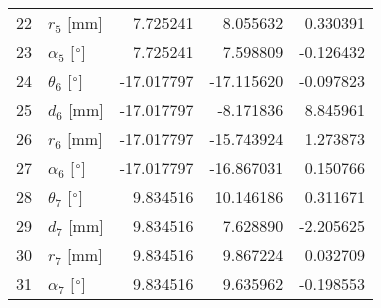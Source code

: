 \documentclass{standalone}%
\begin{document}
\begin{tabular}{llrrr}
22 &              $r_{5}$ [mm] &   7.725241 &   8.055632 &   0.330391 \\
23 &  $\alpha_{5}$ [$\degree$] &   7.725241 &   7.598809 &  -0.126432 \\
24 &  $\theta_{6}$ [$\degree$] & -17.017797 & -17.115620 &  -0.097823 \\
25 &              $d_{6}$ [mm] & -17.017797 &  -8.171836 &   8.845961 \\
26 &              $r_{6}$ [mm] & -17.017797 & -15.743924 &   1.273873 \\
27 &  $\alpha_{6}$ [$\degree$] & -17.017797 & -16.867031 &   0.150766 \\
28 &  $\theta_{7}$ [$\degree$] &   9.834516 &  10.146186 &   0.311671 \\
29 &              $d_{7}$ [mm] &   9.834516 &   7.628890 &  -2.205625 \\
30 &              $r_{7}$ [mm] &   9.834516 &   9.867224 &   0.032709 \\
31 &  $\alpha_{7}$ [$\degree$] &   9.834516 &   9.635962 &  -0.198553 \\
\bottomrule
\end{tabular}
%
\end{document}

